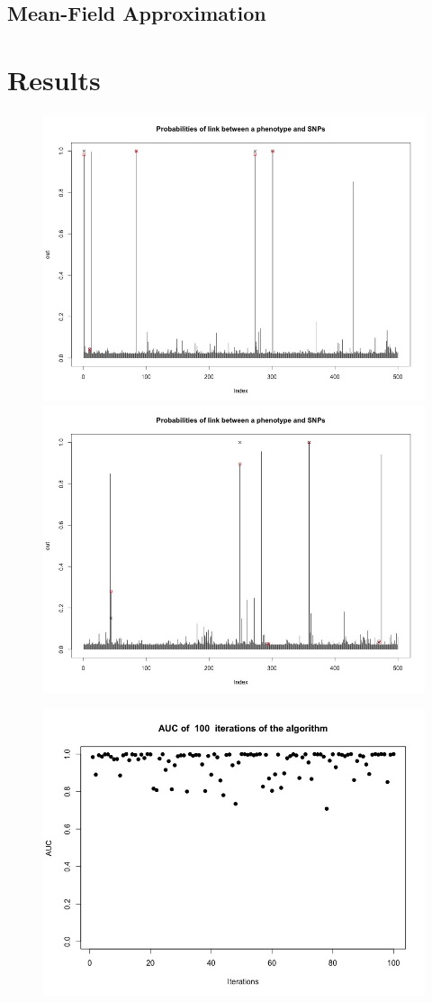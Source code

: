 \documentclass{article}
\begin{document}
\subsection{Mean-Field Approximation}


\newpage
\section{Results}
\begin{figure}
\includegraphics[width=5in]{images/multipleProba1.jpg}
\includegraphics[width=5in]{images/multipleProba2.jpg}
\end{figure}

\begin{figure}
\includegraphics[width=5in]{images/AUC_100_iter.jpeg}
\end{figure}
\newpage
%
%
\end{document}
